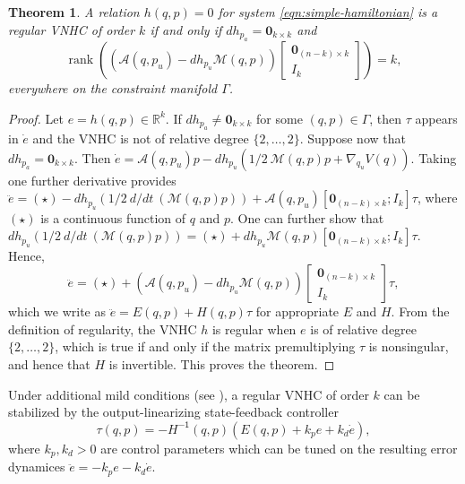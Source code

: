 \documentclass[journal,twoside,web]{ieeecolor}
\newtheorem{thm}{Theorem}%
\DeclareMathOperator{\Rank}{rank}
\newcommand*{\rank}[1]{\Rank\left(#1\right)}
\newcommand*{\inv}{^\mathsf{-1}}
\newcommand*{\R}{\mathbb{R}}
\newcommand*{\Id}[1]{I_{#1}}
\newcommand*{\Zmat}[1]{\bm{0}_{#1}}
\newcommand*{\simpleB}{\begin{bmatrix}\Zmat{(n-k)\times k}\\ \Id{k}\end{bmatrix}}
\begin{document}
\begin{thm}\label{thm:vnhc-regularity}
    A relation \(h(q,p) = 0\) for system \eqref{eqn:simple-hamiltonian}
    is a regular VNHC of order \(k\) if and only if 
    \(dh_{p_a} = \Zmat{k \times k}\) 
    and
    \[
        \rank{\left(\mathcal{A}(q,p_u) - dh_{p_u}\mathcal{M}(q,p)\right)\simpleB} = k
         ,
    \]
    everywhere on the constraint manifold \(\Gamma\).
\end{thm}
\begin{proof}
    Let \(e = h(q,p) \in \R^k\).
    If \(dh_{p_a} \neq \Zmat{k\times k}\) for some \((q,p) \in \Gamma\), 
    then \(\tau\) appears in \(\dot{e}\) and the VNHC is not of relative degree
    \(\{2,\ldots,2\}\). Suppose now that \(dh_{p_a} = \Zmat{k\times k}\).
    Then 
    \(\dot{e} = \mathcal{A}(q,p_u)p - 
     dh_{p_u}\left(1/2~\mathcal{M}(q,p)p + \nabla_{q_u}V(q)\right)\).
    Taking one further derivative provides
    \( \ddot{e} = (\star) - 
        dh_{p_u}\left(1/2~d/dt~\left(\mathcal{M}(q,p)p\right)\right) 
        + \mathcal{A}(q,p_u)[\Zmat{(n-k)\times k};\Id{k}] \tau\),
    where \((\star)\) is a continuous function of \(q\) and \(p\).
    One can further show that
    \(dh_{p_u}\left(1/2~d/dt~\left(\mathcal{M}(q,p)p\right)\right)
        = (\star) + dh_{p_u}\mathcal{M}(q,p)[\Zmat{(n-k)\times k};
        \Id{k}]\tau\).
    Hence,
    \[
       \ddot{e} = (\star) +
       \left(\mathcal{A}(q,p_u) - dh_{p_u}\mathcal{M}(q,p)\right) \simpleB \tau
        ,
    \]
    which we write as \( \ddot{e} = E(q,p) + H(q,p)\tau\) for appropriate \(E\)
    and \(H\).
    From the definition of regularity, the VNHC \(h\) is regular 
    when \(e\) is of relative degree \(\{2,\ldots,2\}\), which is true 
    if and only if the matrix premultiplying \(\tau\) is nonsingular, and hence
    that \(H\) is invertible. This proves the theorem.
\end{proof}

Under additional mild conditions (see \cite{vhcs_for_el_systems}), a regular VNHC of
order \(k\) can be stabilized by the output-linearizing state-feedback
controller
\begin{equation}\label{eqn:stabilizing-controller}
    \tau(q,p) = -H\inv(q,p)\left(E(q,p) + k_p e + k_d \dot{e}\right)
    ,
\end{equation}
where \(k_p, k_d > 0\) are control parameters which can be tuned on the
resulting error dynamices \(\ddot{e} = -k_p e - k_d \dot{e}\).
\end{document}
